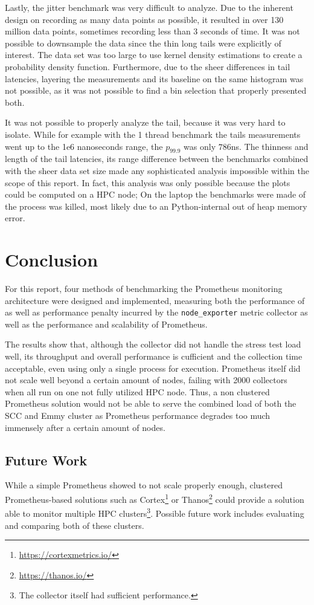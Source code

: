 Lastly, the jitter benchmark was very difficult to analyze. Due to the inherent design on recording as many data points as possible, it resulted in over 130 million data points, sometimes recording less than 3 seconds of time. It was not possible to downsample the data since the thin long tails were explicitly of interest. The data set was too large to use kernel density estimations to create a probability density function. Furthermore, due to the sheer differences in tail latencies, layering the measurements and its baseline on the same histogram was not possible, as it was not possible to find a bin selection that properly presented both.

It was not possible to properly analyze the tail, because it was very hard to isolate. While for example with the 1 thread benchmark the tails measurements went up to the 1e6 nanoseconds range, the $p_{99.9}$ was only $786$ns. The thinness and length of the tail latencies, its range difference between the benchmarks combined with the sheer data set size made any sophisticated analysis impossible within the scope of this report. In fact, this analysis was only possible because the plots could be computed on a \ac{HPC} node; On the laptop the benchmarks were made of the process was killed, most likely due to an Python-internal out of heap memory error.

\section{Conclusion}
For this report, four methods of benchmarking the Prometheus monitoring architecture were designed and implemented, measuring both the performance of as well as performance penalty incurred by the \texttt{node\_exporter} metric collector as well as the performance and scalability of Prometheus.

The results show that, although the collector did not handle the stress test load well, its throughput and overall performance is cufficient and the collection time acceptable, even using only a single process for execution. Prometheus itself did not scale well beyond a certain amount of nodes, failing with 2000 collectors when all run on one not fully utilized \ac{HPC} node. Thus, a non clustered Prometheus solution would not be able to serve the combined load of both the SCC and Emmy cluster as Prometheus performance degrades too much immensely after a certain amount of nodes.

\subsection{Future Work}
While a simple Prometheus showed to not scale properly enough, clustered Prometheus-based solutions such as Cortex\footnote{\url{https://cortexmetrics.io/}} or Thanos\footnote{\url{https://thanos.io/}} could provide a solution able to monitor multiple \ac{HPC} clusters\footnote{The collector itself had sufficient performance.}. Possible future work includes evaluating and comparing both of these clusters.

